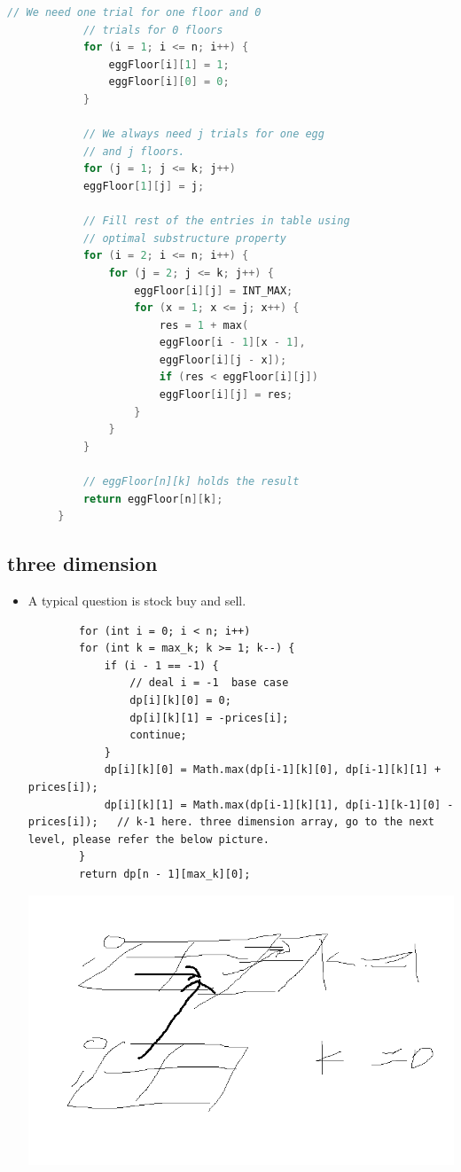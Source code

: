 \documentclass[a4paper,11pt,twoside]{book}
\begin{document}
\begin{itemize}
\begin{lstlisting}[frame=single, language=c++]
			// We need one trial for one floor and 0
			// trials for 0 floors
			for (i = 1; i <= n; i++) {
				eggFloor[i][1] = 1;
				eggFloor[i][0] = 0;
			}
			
			// We always need j trials for one egg
			// and j floors.
			for (j = 1; j <= k; j++)
			eggFloor[1][j] = j;
			
			// Fill rest of the entries in table using
			// optimal substructure property
			for (i = 2; i <= n; i++) {
				for (j = 2; j <= k; j++) {
					eggFloor[i][j] = INT_MAX;
					for (x = 1; x <= j; x++) {
						res = 1 + max(
						eggFloor[i - 1][x - 1],
						eggFloor[i][j - x]);
						if (res < eggFloor[i][j])
						eggFloor[i][j] = res;
					}
				}
			}
			
			// eggFloor[n][k] holds the result
			return eggFloor[n][k];
		}
	\end{lstlisting}
	
	
	
\end{itemize}

\subsection{three dimension}
\begin{itemize}
	\item A typical question is stock buy and sell. 
	\begin{lstlisting}
		for (int i = 0; i < n; i++) 
		for (int k = max_k; k >= 1; k--) {
			if (i - 1 == -1) {
				// deal i = -1  base case
				dp[i][k][0] = 0;
				dp[i][k][1] = -prices[i];
				continue;
			}
			dp[i][k][0] = Math.max(dp[i-1][k][0], dp[i-1][k][1] + prices[i]);
			dp[i][k][1] = Math.max(dp[i-1][k][1], dp[i-1][k-1][0] - prices[i]);   // k-1 here. three dimension array, go to the next level, please refer the below picture.
		}
		return dp[n - 1][max_k][0];
	\end{lstlisting}
	
	\includegraphics[width=0.7\linewidth]{pics/stock.png} 
\end{itemize}
\end{document}
